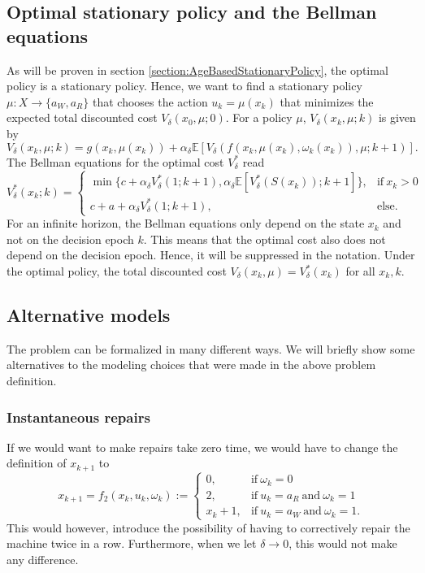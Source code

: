 \documentclass[a4paper]{thesis}
\theoremstyle{definition}
\begin{document}
\subsection{Optimal stationary policy and the Bellman equations}
As will be proven in section \ref{section:AgeBasedStationaryPolicy}, the optimal policy is a stationary policy.
Hence, we want to find a stationary policy $\mu:X\rightarrow \{a_W,a_R\}$ that chooses the action $u_k=\mu(x_k)$ that minimizes the expected total discounted cost $V_\delta(x_0,\mu;0)$.
For a policy $\mu$, $V_\delta(x_k,\mu;k)$ is given by
$$
V_\delta(x_k,\mu;k)=g(x_k,\mu(x_k))+\alpha_\delta \mathbb{E}[V_\delta(f(x_k,\mu(x_k),\omega_k(x_k)),\mu;k+1)].
$$
The Bellman equations for the optimal cost $V^*_\delta$ read
\begin{equation}\label{eq:AgeBasedBellman}
V^*_\delta(x_k;k)=\begin{cases}
\min\{c+\alpha_\delta V^*_\delta(1;k+1),\alpha_\delta \mathbb{E}[V^*_\delta(S(x_k));k+1]\},&\text{if}\ x_k>0 \\
c+a+\alpha_\delta V^*_\delta(1;k+1),&\text{else.}
\end{cases}
\end{equation}
For an infinite horizon, the Bellman equations only depend on the state $x_k$ and not on the decision epoch $k$.
This means that the optimal cost also does not depend on the decision epoch.
Hence, it will be suppressed in the notation.
Under the optimal policy, the total discounted cost $V_\delta(x_k,\mu)=V^*_\delta(x_k)$ for all $x_k,k$.

\subsection{Alternative models}
The problem can be formalized in many different ways.
We will briefly show some alternatives to the modeling choices that were made in the above problem definition.
\subsubsection{Instantaneous repairs}
If we would want to make repairs take zero time, we would have to change the definition of $x_{k+1}$ to 
$$
x_{k+1}=f_2(x_k,u_k,\omega_k):=\begin{cases}
0,&\text{if}\ \omega_k=0 \\
2,&\text{if}\ u_k=a_R\ \text{and}\ \omega_k=1\\
x_k+1,&\text{if}\ u_k=a_W\ \text{and}\ \omega_k=1.
\end{cases}
$$
This would however, introduce the possibility of having to correctively repair the machine twice in a row.
Furthermore, when we let $\delta\rightarrow 0$, this would not make any difference.
\end{document}
